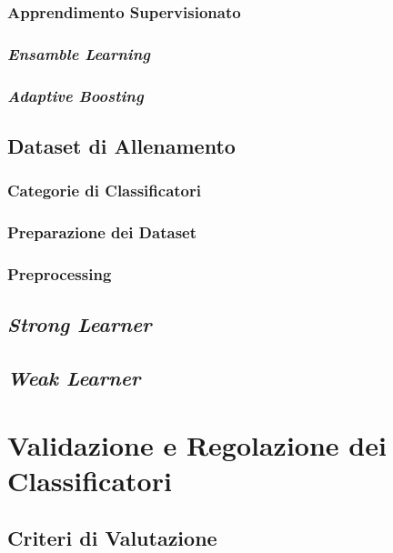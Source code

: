         \subsection{Apprendimento Supervisionato}
        \label{sub:supervised_learning}
        \subsection{\emph{Ensamble Learning}}
        \label{sub:ensamble_learning}
        \subsection{\emph{Adaptive Boosting}}
        \label{sub:adaptive_boosting}
    \section{Dataset di Allenamento}
    \label{sec:training_dataset}
        \subsection{Categorie di Classificatori}
        \label{sub:classifiers_categories}
        \subsection{Preparazione dei Dataset}
        \label{sub:datasets_setup}
        \subsection{Preprocessing}
        \label{sub:preprocessing}
    \section{\emph{Strong Learner}}
    \label{sec:strong_learner}
    \section{\emph{Weak Learner}}
    \label{sec:weak_learner}

\chapter{Validazione e Regolazione dei Classificatori}
\label{chap:tuning}
    \section{Criteri di Valutazione}
    \label{sec:evaluation_criteria}
